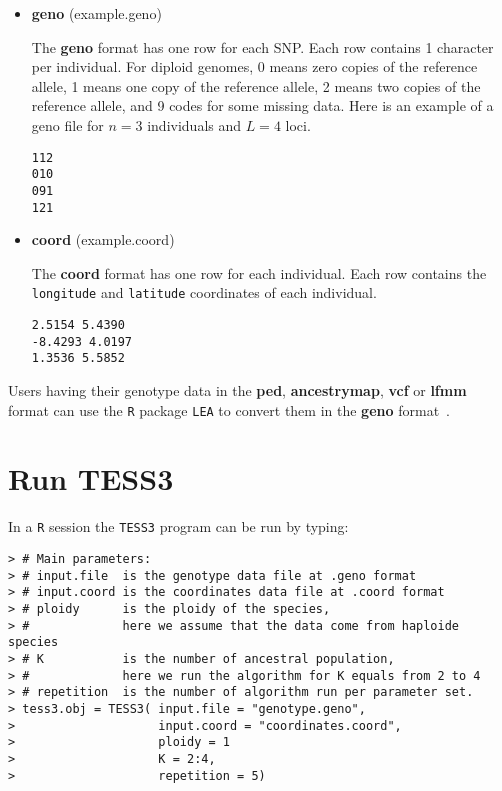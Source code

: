 \documentclass[10pt,a4paper]{article}
\begin{document}
\begin{itemize}
\item {\bf geno} (example.geno)

The {\bf geno} format has one row for each SNP. Each row contains 1 character 
per individual. For diploid genomes,  0 means zero copies of the reference 
allele, 1 means one copy of the reference allele, 2 means two copies of the 
reference allele, and 9 codes for some missing data. Here is an example of a 
geno file for $n=3$ individuals and $L=4$ loci.
\\
\begin{center}
\footnotesize
\begin{Verbatim}[frame=single]
112
010
091
121
\end{Verbatim}
\end{center}


\item {\bf coord} (example.coord)

The {\bf coord} format has one row for each individual. Each row contains the 
\verb|longitude| and \verb|latitude| coordinates of each individual.
\\
\begin{center}
\footnotesize
\begin{Verbatim}[frame=single]
2.5154 5.4390
-8.4293 4.0197
1.3536 5.5852
\end{Verbatim}
\end{center}

\end{itemize}

\noindent Users having their genotype data in the {\bf ped}, {\bf ancestrymap}, 
{\bf vcf} or {\bf lfmm} format  can use the {\tt R} package {\tt LEA} to convert 
them in the {\bf geno} format~\cite{frichot2015lea}. 

\section{Run TESS3}

In a {\tt R} session the {\tt TESS3} program can be run by typing: 

\begin{Verbatim}[frame=single]
> # Main parameters:
> # input.file  is the genotype data file at .geno format
> # input.coord is the coordinates data file at .coord format
> # ploidy      is the ploidy of the species, 
> #             here we assume that the data come from haploide species
> # K           is the number of ancestral population, 
> #             here we run the algorithm for K equals from 2 to 4
> # repetition  is the number of algorithm run per parameter set.
> tess3.obj = TESS3( input.file = "genotype.geno", 
>                    input.coord = "coordinates.coord", 
>                    ploidy = 1
>                    K = 2:4,
>                    repetition = 5)
\end{Verbatim}
\end{document}
